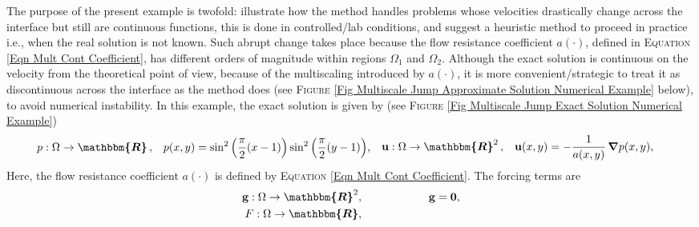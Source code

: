 \documentclass[3p]{elsarticle}
\def\g{\mathbf g}
\def\u{\mathbf u}
\def\grad{\bm{\nabla}}
\def\R{\bm{\mathbbm{R} } }
\def\defining{\overset{\mathbf{def}} =}
\def\ind{\boldsymbol{\mathbbm{1}}}
\begin{document}
%
%
\begin{example}\label{Ex Multiscale Jump Example}
The purpose of the present example is twofold: illustrate how the method handles problems whose velocities drastically change across the interface but still are continuous functions, this is done in controlled/lab conditions, and suggest a heuristic method to proceed in practice i.e., when the real solution is not known. Such abrupt change takes place because the flow resistance coefficient $ a (\cdot) $, defined in  \textsc{Equation} \eqref{Eqn Mult Cont Coefficient}, has different orders of magnitude within regions $ \Omega_{1} $ and $ \Omega_{2} $. Although the exact solution is continuous on the velocity from the theoretical point of view, because of the multiscaling introduced by $ a( \cdot ) $, it is more convenient/strategic to treat it as discontinuous across the interface as the method does (see \textsc{Figure}  \ref{Fig Multiscale Jump Approximate Solution Numerical Example} below), to avoid numerical instability. In this example, the exact solution is given by (see \textsc{Figure} \ref{Fig Multiscale Jump Exact Solution Numerical Example})
%
\begin{subequations}\label{Eqn Mult Jump Exact Solutions}
%
\begin{align}\label{Eqn Mult Jump Exact Pressure}
& p: \Omega \rightarrow \R \, ,&
& p(x, y) = \sin^{2}\Big( \frac{\pi}{2}(x - 1)\Big)
 \sin^{2}\Big( \frac{\pi}{2}(y - 1)\Big),  
\end{align}
%
\begin{align}\label{Eqn Mult Jump Exact Velocity}
& \u: \Omega\rightarrow \R^{2} \, , &
& \u(x, y) = -\frac{1}{a(x, y)}\,\grad p(x,y),
\end{align}
%
\end{subequations}
%
%
Here, the flow resistance coefficient $ a(\cdot) $ is defined by \textsc{Equation} \eqref{Eqn Mult Cont Coefficient}. The forcing terms are
%
\begin{subequations}\label{Eqn Mult Jump Forcing Terms}
%
\begin{equation}\label{Eqn Int Mult Jump Forcing Terms}
%
\begin{split}
\g: \Omega \rightarrow \R^{2}, \qquad\qquad\qquad &
\g = \boldsymbol{0} ,  \\
%
F: \Omega \rightarrow \R , \qquad\qquad\qquad &

\end{split}
\end{equation}
\end{subequations}
\end{example}
\end{document}

